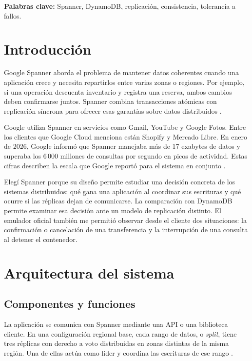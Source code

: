 \documentclass[11pt,a4paper]{article}
\begin{document}
\textbf{Palabras clave:} Spanner, DynamoDB, replicación, consistencia, tolerancia a fallos.

\section{Introducción}
Google Spanner aborda el problema de mantener datos coherentes cuando una aplicación crece y necesita repartirlos entre varias zonas o regiones. Por ejemplo, si una operación descuenta inventario y registra una reserva, ambos cambios deben confirmarse juntos. Spanner combina transacciones atómicas con replicación síncrona para ofrecer esas garantías sobre datos distribuidos \cite{GoogleSpannerTransactions,GoogleSpannerReplication}.

Google utiliza Spanner en servicios como Gmail, YouTube y Google Fotos. Entre los clientes que Google Cloud menciona están Shopify y Mercado Libre. En enero de 2026, Google informó que Spanner manejaba más de 17 exabytes de datos y superaba los 6\,000 millones de consultas por segundo en picos de actividad. Estas cifras describen la escala que Google reportó para el sistema en conjunto \cite{ChatterjeeMathur2026Spanner}.

Elegí Spanner porque su diseño permite estudiar una decisión concreta de los sistemas distribuidos: qué gana una aplicación al coordinar sus escrituras y qué ocurre si las réplicas dejan de comunicarse. La comparación con DynamoDB permite examinar esa decisión ante un modelo de replicación distinto. El emulador oficial también me permitió observar desde el cliente dos situaciones: la confirmación o cancelación de una transferencia y la interrupción de una consulta al detener el contenedor.

\section{Arquitectura del sistema}
\subsection{Componentes y funciones}
La aplicación se comunica con Spanner mediante una API o una biblioteca cliente. En una configuración regional base, cada rango de datos, o \emph{split}, tiene tres réplicas con derecho a voto distribuidas en zonas distintas de la misma región. Una de ellas actúa como líder y coordina las escrituras de ese rango \cite{GoogleSpannerAPIs,GoogleSpannerReplication}.
\end{document}
